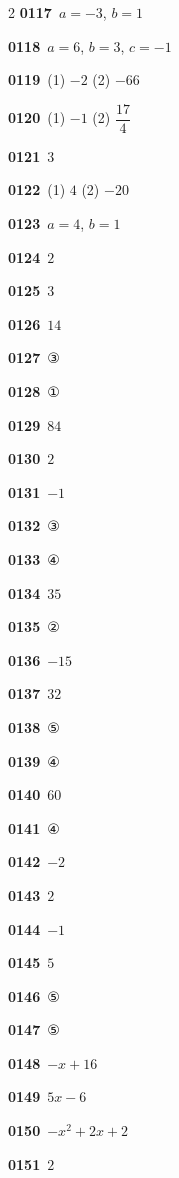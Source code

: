 \documentclass[10pt,a4paper]{article}
\begin{document}
\begin{multicols}{2}
\noindent\textbf{0117}\ $a=-3$, $b=1$\par
\noindent\textbf{0118}\ $a=6$, $b=3$, $c=-1$\par
\noindent\textbf{0119}\ (1) $-2$ (2) $-66$\par
\noindent\textbf{0120}\ (1) $-1$ (2) $\dfrac{17}{4}$\par
\noindent\textbf{0121}\ $3$\par
\noindent\textbf{0122}\ (1) $4$ (2) $-20$\par
\noindent\textbf{0123}\ $a=4$, $b=1$\par
\noindent\textbf{0124}\ $2$\par
\noindent\textbf{0125}\ $3$\par
\noindent\textbf{0126}\ $14$\par
\noindent\textbf{0127}\ ③\par
\noindent\textbf{0128}\ ①\par
\noindent\textbf{0129}\ $84$\par
\noindent\textbf{0130}\ $2$\par
\noindent\textbf{0131}\ $-1$\par
\noindent\textbf{0132}\ ③\par
\noindent\textbf{0133}\ ④\par
\noindent\textbf{0134}\ $35$\par
\noindent\textbf{0135}\ ②\par
\noindent\textbf{0136}\ $-15$\par
\noindent\textbf{0137}\ $32$\par
\noindent\textbf{0138}\ ⑤\par
\noindent\textbf{0139}\ ④\par
\noindent\textbf{0140}\ $60$\par
\noindent\textbf{0141}\ ④\par
\noindent\textbf{0142}\ $-2$\par
\noindent\textbf{0143}\ $2$\par
\noindent\textbf{0144}\ $-1$\par
\noindent\textbf{0145}\ $5$\par
\noindent\textbf{0146}\ ⑤\par
\noindent\textbf{0147}\ ⑤\par
\noindent\textbf{0148}\ $-x+16$\par
\noindent\textbf{0149}\ $5x-6$\par
\noindent\textbf{0150}\ $-x^2+2x+2$\par
\noindent\textbf{0151}\ $2$\par

\end{multicols}
\end{document}
